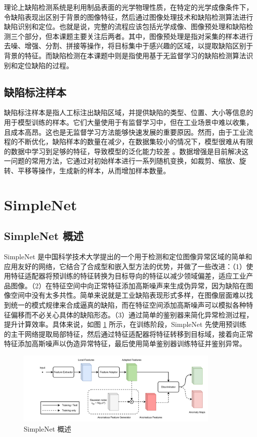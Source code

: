 \documentclass[
  ]{njuthesis}
\begin{document}
理论上缺陷检测系统是利用制品表面的光学物理性质，在特定的光学成像条件下，令缺陷表现出区别于背景的图像特征，然后通过图像处理技术和缺陷检测算法进行缺陷识别和定位\cite{[11]}。也就是说，完整的流程应该包括光学成像、图像预处理和缺陷检测三个部分，但本课题主要关注后两者。其中，图像预处理是指对采集的样本进行去噪、增强、分割、拼接等操作，将目标集中于感兴趣的区域，以提取缺陷区别于背景的特征。而缺陷检测在本课题中则是指使用基于无监督学习的缺陷检测算法识别和定位缺陷的过程。

\subsection{缺陷标注样本}

缺陷标注样本是指人工标注出缺陷区域，并提供缺陷的类型、位置、大小等信息的用于模型训练的样本。它们大量使用于有监督学习中，但在工业场景中难以收集，且成本高昂。这也是无监督学习方法能够快速发展的重要原因。然而，由于工业流程的不断优化，缺陷样本的数量在减少，在数据集较小的情况下，模型很难从有限的数据中学习到足够的特征，导致模型的泛化能力较差 \cite{[12]}。数据增强是目前解决这一问题的常用方法，它通过对初始样本进行一系列随机变换，如裁剪、缩放、旋转、平移等操作，生成新的样本，从而增加样本数量。

\section{SimpleNet}

\subsection{SimpleNet 概述}

SimpleNet\cite{[13]} 是中国科学技术大学提出的一个用于检测和定位图像异常区域的简单和应用友好的网络，它结合了合成型和嵌入型方法的优势，并做了一些改进：（1）使用特征适配器将预训练的特征转换为目标导向的特征以减少领域偏差，适应工业产品图像。（2）在特征空间中向正常特征添加高斯噪声来生成伪异常，因为缺陷在图像空间中没有太多共性。简单来说就是工业缺陷表现形式多样，在图像层面难以找到统一的模式规律来合成逼真的缺陷，而在特征空间添加高斯噪声可以模拟各种特征偏移而不必关心具体的缺陷形态。（3）通过简单的鉴别器来简化异常检测过程，提升计算效率。具体来说，如图 \ref{SimpleNet} 所示，在训练阶段，SimpleNet 先使用预训练的主干网络提取局部特征，然后通过特征适配器将特征转移到目标域，接着向正常特征添加高斯噪声以伪造异常特征，最后使用简单鉴别器训练特征并鉴别异常。

\begin{figure}[ht]
    \centering
    \includegraphics[width=0.88\textwidth]{images/SimpleNet概述.png}
    \caption{SimpleNet 概述}
    \label{SimpleNet}
\end{figure}
\end{document}

